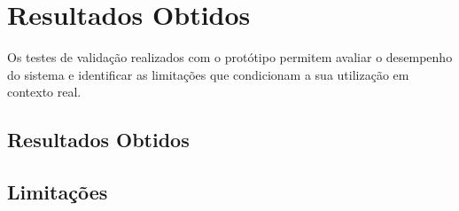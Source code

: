 

\chapter{Resultados Obtidos}
\label{chapter:validation}

\begin{introduction}
Os testes de validação realizados com o protótipo permitem avaliar o desempenho do sistema e identificar as limitações que condicionam a sua utilização em contexto real.
\end{introduction}



\section{Resultados Obtidos}
\label{sec:resultados_obtidos}


\section{Limitações}
\label{sec:limitaçoes}

